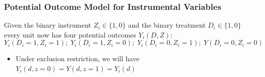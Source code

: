 \documentclass[xcolor=dvipsnames]{beamer}
\newtheorem{assumption}{Assumption}
\newcommand{\indep}{{\bot\negthickspace\negthickspace\bot}}
\begin{document}

\begin{frame}
  \frametitle{Potential Outcome Model for Instrumental Variables}
  \small
\begin{definition}
Given the binary instrument $Z_i \in \{1,0\}$ and the binary treatment $D_i \in \{1,0\}$ every unit now has four potential outcomes $Y_i(D,Z)$:
$$Y_i(D_i=1,Z_i=1);\; Y_i(D_i=1,Z_i=0);\; Y_i(D_i=0,Z_i=1);\; Y(D_i=0,Z_i=0)$$
\end{definition}

\bigskip
\begin{itemize}
\item<2-> Under exclusion restriction, we will have  $Y_i(d,z=0)=Y(d,z=1) = Y_i(d)$ 
\end{itemize}
%
\end{frame}
\end{document}
